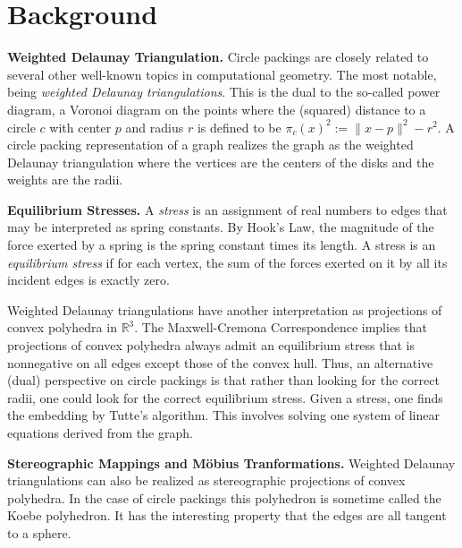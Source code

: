 \documentclass[a4paper,UKenglish]{lipics}
\newcommand{\R}{\mathbb{R}}
\begin{document}

\section{Background} %
\label{sec:background}

  \textbf{Weighted Delaunay Triangulation.}
  Circle packings are closely related to several other well-known topics in computational geometry.
  The most notable, being \emph{weighted Delaunay triangulations}.  
  This is the dual to the so-called power diagram, a Voronoi diagram on the points where the (squared) distance to a circle $c$ with center $p$ and radius $r$ is defined to be $\pi_c(x)^2 := \|x-p\|^2 - r^2$.
  A circle packing representation of a graph realizes the graph as the weighted Delaunay triangulation where the vertices are the centers of the disks and the weights are the radii.
  
  \textbf{Equilibrium Stresses.} %
    A \emph{stress} is an assignment of real numbers to edges that may be interpreted as spring constants.
    By Hook's Law, the magnitude of the force exerted by a spring is the spring constant times its length.
    A stress is an \emph{equilibrium stress} if for each vertex, the sum of the forces exerted on it by all its incident edges is exactly zero.
    
    Weighted Delaunay triangulations have another interpretation as projections of convex polyhedra in $\R^3$.
    The Maxwell-Cremona Correspondence implies that projections of convex polyhedra always admit an equilibrium stress that is nonnegative on all edges except those of the convex hull.
    Thus, an alternative (dual) perspective on circle packings is that rather than looking for the correct radii, one could look for the correct equilibrium stress.
    Given a stress, one finds the embedding by Tutte's algorithm.
    This involves solving one system of linear equations derived from the graph.
  
  \textbf{Stereographic Mappings and M\"{o}bius Tranformations.} %
    Weighted Delaunay triangulations can also be realized as stereographic projections of convex polyhedra.
    In the case of circle packings this polyhedron is sometime called the Koebe polyhedron.
    It has the interesting property that the edges are all tangent to a sphere.
\end{document}
